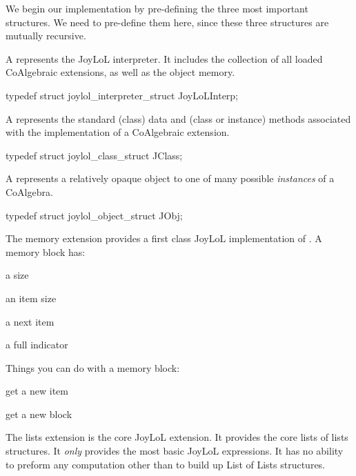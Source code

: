 We begin our implementation by pre-defining the three most important 
structures. We need to pre-define them here, since these three structures 
are mutually recursive. 

\startitemize

\item A  represents the JoyLoL interpreter. It includes 
the collection of all loaded CoAlgebraic extensions, as well as the object 
memory. 

\startCHeader 
typedef struct joylol_interpreter_struct JoyLoLInterp;
\stopCHeader 

\item A  represents the standard (class) data and (class 
or instance) methods associated with the implementation of a CoAlgebraic 
extension. 

\startCHeader
typedef struct joylol_class_struct JClass;
\stopCHeader

\item A  represents a relatively opaque object to one of 
many possible \emph{instances} of a CoAlgebra. 

\startCHeader
typedef struct joylol_object_struct JObj;
\stopCHeader 
\stopitemize

The memory extension provides a first class JoyLoL implementation of 
. A memory block has:

\startitemize

\item a size

\item an item size

\item a next item

\item a full indicator

\stopitemize

Things you can do with a memory block:

\startitemize

\item get a new item

\item get a new block

\stopitemize


The lists extension is the core JoyLoL extension. It provides the core 
lists of lists structures. It \emph{only} provides the most basic JoyLoL 
expressions. It has no ability to preform any computation other than to 
build up List of Lists structures. 


